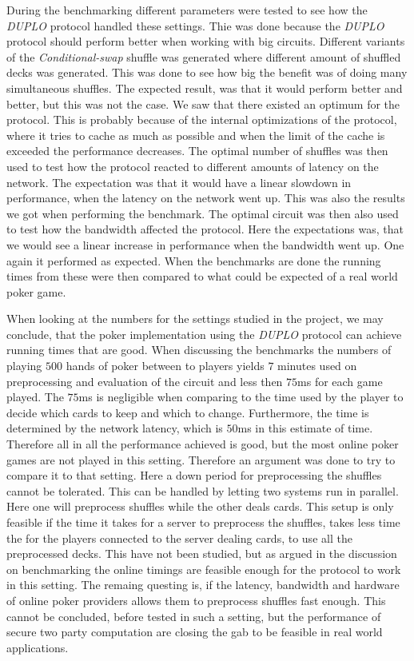 \documentclass[twoside,11pt,openright]{report}
\newcommand{\CS}{\textit{Conditional-swap} }
\newcommand{\DUPLO}{\textit{DUPLO} }
\begin{document}
During the benchmarking different parameters were tested to see how the \DUPLO protocol handled these settings. Thie was done because the \DUPLO protocol should perform better when working with big circuits. Different variants of the \CS shuffle was generated where different amount of shuffled decks was generated. This was done to see how big the benefit was of doing many simultaneous shuffles. The expected result, was that it would perform better and better, but this was not the case. We saw that there existed an optimum for the protocol. This is probably because of the internal optimizations of the protocol, where it tries to cache as much as possible and when the limit of the cache is exceeded the performance decreases. The optimal number of shuffles was then used to test how the protocol reacted to different amounts of latency on the network. The expectation was that it would have a linear slowdown in performance, when the latency on the network went up. This was also the results we got when performing the benchmark. The optimal circuit was then also used to test how the bandwidth affected the protocol. Here the expectations was, that we would see a linear increase in performance when the bandwidth went up. One again it performed as expected. When the benchmarks are done the running times from these were then compared to what could be expected of a real world poker game.

When looking at the numbers for the settings studied in the project, we may conclude, that the poker implementation using the \DUPLO protocol can achieve running times that are good. When discussing the benchmarks the numbers of playing $500$ hands of poker between to players yields $7$ minutes used on preprocessing and evaluation of the circuit and less then $75$ms for each game played. The $75$ms is negligible when comparing to the time used by the player to decide which cards to keep and which to change. Furthermore, the time is determined by the network latency, which is $50$ms in this estimate of time. Therefore all in all the performance achieved is good, but the most online poker games are not played in this setting. Therefore an argument was done to try to compare it to that setting. Here a down period for preprocessing the shuffles cannot be tolerated. This can be handled by letting two systems run in parallel. Here one will preprocess shuffles while the other deals cards. This setup is only feasible if the time it takes for a server to preprocess the shuffles, takes less time the for the players connected to the server dealing cards, to use all the preprocessed decks. This have not been studied, but as argued in the discussion on benchmarking the online timings are feasible enough for the protocol to work in this setting. The remaing questing is, if the latency, bandwidth and hardware of online poker providers allows them to preprocess shuffles fast enough. This cannot be concluded, before tested in such a setting, but the performance of secure two party computation are closing the gab to be feasible in real world applications.
\end{document}
